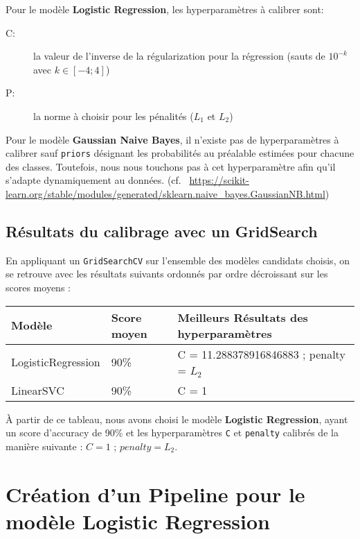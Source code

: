 \documentclass[11pt]{article}
\begin{document}
Pour le modèle \textbf{Logistic Regression}, les hyperparamètres à
calibrer sont:
\begin{description}
  \item[C:] la valeur de l'inverse de la
  régularization pour la régression (sauts de \(10^{-k}\) avec \(k \in [-4;4]\))
  \item[P:] la norme à choisir pour les pénalités (\(L_1\) et \(L_2\))
\end{description}

Pour le modèle \textbf{Gaussian Naive Bayes}, il n'existe pas de
hyperparamètres à calibrer sauf \texttt{priors} désignant les
probabilités au préalable estimées pour chacune des classes. Toutefois,
nous nous touchons pas à cet hyperparamètre afin qu'il s'adapte
dynamiquement au données.
(cf.~ \url{https://scikit-learn.org/stable/modules/generated/sklearn.naive\_bayes.GaussianNB.html})



\hypertarget{ruxe9sultats-du-calibrage-avec-un-gridsearch}{%
\subsection{Résultats du calibrage avec un
GridSearch}\label{ruxe9sultats-du-calibrage-avec-un-gridsearch}}

En appliquant un \texttt{GridSearchCV} sur l'ensemble des modèles
candidats choisis, on se retrouve avec les résultats suivants ordonnés
par ordre décroissant sur les scores moyens :

\begin{longtable}[]{@{}lll@{}}
\toprule
Modèle & Score moyen & Meilleurs Résultats des
hyperparamètres\tabularnewline
\midrule
\endhead
LogisticRegression & 90\% & C = 11.288378916846883 ; penalty =
\(L_2\)\tabularnewline
LinearSVC & 90\% & C = 1\tabularnewline
\bottomrule
\end{longtable}

À partir de ce tableau, nous avons choisi le modèle \textbf{Logistic
Regression}, ayant un score d'accuracy de 90\% et les hyperparamètres
\texttt{C} et \texttt{penalty} calibrés de la manière suivante :
\(C = 1\) ; \(penalty = L_2\).

\hypertarget{cruxe9ation-dun-pipeline-pour-le-moduxe8le-logistic-regression}{%
\section{Création d'un Pipeline pour le modèle Logistic
Regression}\label{cruxe9ation-dun-pipeline-pour-le-moduxe8le-logistic-regression}}
\end{document}
